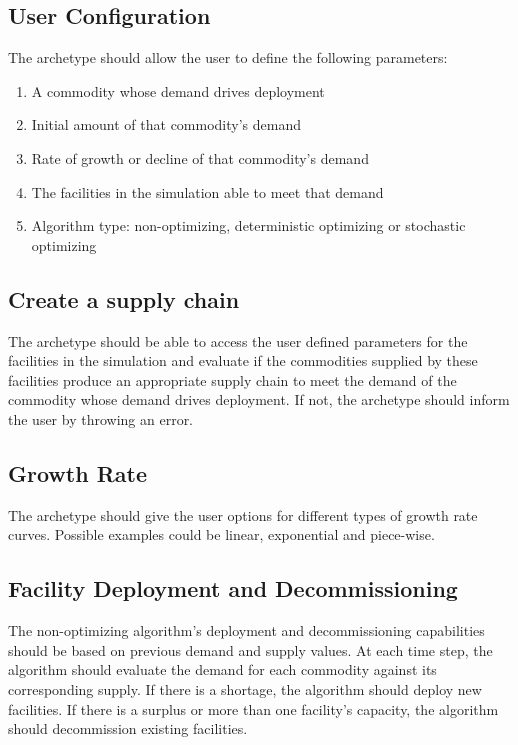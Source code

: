 \documentclass[11pt,letterpaper]{article}
\begin{document}
\subsection{User Configuration}
\label{subsection-user}
The archetype should allow the user to define the following parameters: 
\begin{enumerate}
	\item A commodity whose demand drives deployment
	\item Initial amount of that commodity's demand
	\item Rate of growth or decline of that commodity's demand
	\item The facilities in the simulation able to meet that demand
	\item Algorithm type: non-optimizing, deterministic optimizing or stochastic optimizing
\end{enumerate}

\subsection{Create a supply chain}
\label{subsection-supplychain}
The archetype should be able to access the user defined parameters for the facilities in the simulation and evaluate if the commodities supplied by these facilities produce an appropriate supply chain to meet the demand of the commodity whose demand drives deployment. If not, the archetype should inform the user by throwing an error.  

\subsection{Growth Rate}
\label{subsection-rate}
The archetype should give the user options for different types of growth rate curves. Possible examples could be linear, exponential and piece-wise. 

\subsection{Facility Deployment and Decommissioning }
\label{subsection-deploy}
 The non-optimizing algorithm's deployment and decommissioning capabilities should be based on previous demand and supply values. At each time step, the algorithm should evaluate the demand for each commodity against its corresponding supply. If there is a shortage, the algorithm should deploy new facilities. If there is a surplus or more than one facility's capacity, the algorithm should decommission existing facilities. 
 
\end{document}
